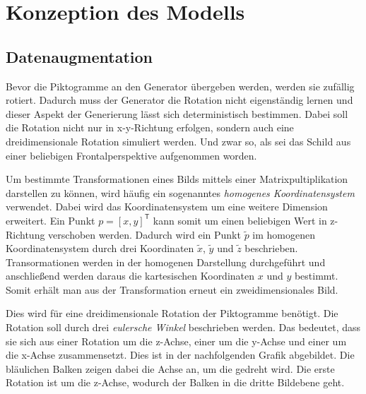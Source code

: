 \chapter{Konzeption des Modells}
\label{chap:konzept}







\section{Datenaugmentation}
Bevor die Piktogramme an den Generator übergeben werden, werden sie zufällig rotiert. Dadurch muss der Generator die Rotation nicht eigenständig lernen und dieser Aspekt der Generierung lässt sich deterministisch bestimmen. Dabei soll die Rotation nicht nur in x-y-Richtung erfolgen, sondern auch eine dreidimensionale Rotation simuliert werden. Und zwar so, als sei das Schild aus einer beliebigen Frontalperspektive aufgenommen worden.

Um bestimmte Transformationen eines Bilds mittels einer Matrixpultiplikation darstellen zu können, wird häufig ein sogenanntes \emph{homogenes Koordinatensystem} verwendet. Dabei wird das Koordinatensystem um eine weitere Dimension erweitert. Ein Punkt $p = [x, y]^\mathsf{T}$ kann somit um einen beliebigen Wert in z-Richtung verschoben werden. Dadurch wird ein Punkt $\tilde{p}$ im homogenen Koordinatensystem durch drei Koordinaten $\tilde{x}$, $\tilde{y}$ und $\tilde{z}$ beschrieben. Transormationen werden in der homogenen Darstellung durchgeführt und anschließend werden daraus die kartesischen Koordinaten $x$ und $y$ bestimmt. Somit erhält man aus der Transformation erneut ein zweidimensionales Bild. \cite{geometric-ops} \cite{math-primer}

Dies wird für eine dreidimensionale Rotation der Piktogramme benötigt. Die Rotation soll durch drei \emph{eulersche Winkel} beschrieben werden. Das bedeutet, dass sie sich aus einer Rotation um die z-Achse, einer um die y-Achse und einer um die x-Achse zusammensetzt. Dies ist in der nachfolgenden Grafik abgebildet. Die bläulichen Balken zeigen dabei die Achse an, um die gedreht wird. Die erste Rotation ist um die z-Achse, wodurch der Balken in die dritte Bildebene geht. \cite{math-primer}

